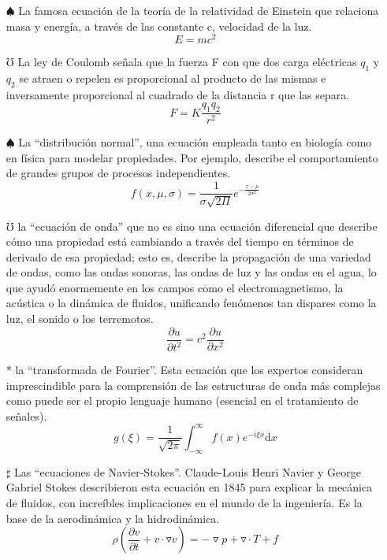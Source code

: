\documentclass[4apaper, 12pt]{article}
\begin{document}
\begin{itemize}
    \item[$\spadesuit$] La famosa ecuación de la teoría de la relatividad de Einstein que relaciona masa y energía, a través de las constante c, velocidad de la luz.
    \begin{equation*}
        E=mc^2
    \end{equation*}
     \item[$\mho$]La ley de Coulomb señala que la fuerza F con que dos carga eléctricas $q_1$ y $q_2$ se atraen o repelen es proporcional al producto de las mismas e inversamente proporcional al cuadrado de la distancia r que las separa.
    \begin{equation*}
        F=K\frac{q_1q_2}{r^2}
    \end{equation*}
    \item[$\spadesuit$] La “distribución normal”, una ecuación empleada tanto en biología como en física para modelar propiedades. Por ejemplo, describe el comportamiento de grandes grupos de procesos independientes.
      \begin{equation*}
          f(x,\mu,\sigma)=\frac{1}{\sigma\sqrt{2\Pi}}e^{-\frac{x-\mu}{2\sigma^2}}
      \end{equation*}
      \item[$\mho$] la “ecuación de onda” que no es sino una ecuación diferencial que describe cómo una propiedad está cambiando a través del tiempo en términos de derivado de esa propiedad; esto es, describe la propagación de una variedad de ondas, como las ondas sonoras, las ondas de luz y las ondas en el agua, lo que ayudó enormemente en los campos como el electromagnetismo, la acústica o la dinámica de fluidos, unificando fenómenos tan dispares como la luz, el sonido o los terremotos.
      \[\frac{\partial u}{\partial t^2}=c^2\frac{\partial u}{\partial x^2}\]
    \item [*]la “transformada de Fourier”. Esta ecuación que los expertos consideran imprescindible para la comprensión de las estructuras de onda más complejas como puede ser el propio lenguaje humano (esencial en el tratamiento de señales).
    $$g(\xi)=\frac{1}{\sqrt{2\pi}}\int_{-\infty}^{\infty}f(x)e^{-i\xi x}\mathrm{d}x$$
    \item[$\sharp$]Las “ecuaciones de Navier-Stokes”. Claude-Louis Henri Navier y George Gabriel Stokes describieron esta ecuación en 1845 para explicar la mecánica de fluidos, con increíbles implicaciones en el mundo de la ingeniería. Es la base de la aerodinámica y la hidrodinámica. 
    \begin{equation*}
        \rho(\frac{\partial v}{\partial t}+v\cdot\triangledown v)=-\triangledown p+\triangledown\cdot T+f
    \end{equation*}

\end{itemize}
\end{document}
